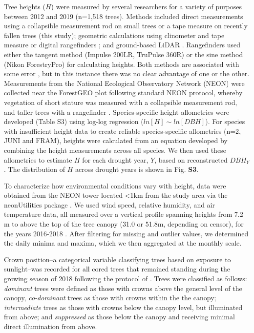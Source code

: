 \documentclass[
]{article}
\begin{document}
Tree heights (\(H\)) were measured by several researchers for a variety
of purposes between 2012 and 2019 (n=1,518 trees). Methods included
direct measurements using a collapsible measurement rod on small trees
\citep{neon_national_2018} or a tape measure on recently fallen trees
(this study); geometric calculations using clinometer and tape measure
\citep{stovall_assessing_2018} or digital rangefinders
\citep{andersonteixeira_size-related_2015, neon_national_2018}; and
ground-based LiDAR \citep{stovall_terrestrial_2018}. Rangefinders used
either the tangent method (Impulse 200LR, TruPulse 360R) or the sine
method (Nikon ForestryPro) for calculating heights. Both methods are
associated with some error \citep{larjavaara_measuring_2013}, but in
this instance there was no clear advantage of one or the other.
Measurements from the National Ecological Observatory Network (NEON)
were collected near the ForestGEO plot following standard NEON protocol,
whereby vegetation of short stature was measured with a collapsible
measurement rod, and taller trees with a rangefinder
\citep{neon_national_2018}. Species-specific height allometries were
developed (Table S3) using log-log regression (\(ln[H] \sim ln[DBH]\)).
For species with insufficient height data to create reliable
species-specific allometries (n=2, JUNI and FRAM), heights were
calculated from an equation developed by combining the height
measurements across all species. We then used these allometries to
estimate \(H\) for each drought year, \(Y\), based on reconstructed
\(DBH_Y\). The distribution of \(H\) across drought years is shown in
Fig. \textbf{S3}.

To characterize how environmental conditions vary with height, data were
obtained from the NEON tower located \textless1km from the study area
via the neonUtilities package \citep{R-neonUtilities}. We used wind
speed, relative humidity, and air temperature data, all measured over a
vertical profile spanning heights from 7.2 m to above the top of the
tree canopy (31.0 or 51.8m, depending on censor), for the years
2016-2018 \citep{neon_national_2018}. After filtering for missing and
outlier values, we determined the daily minima and maxima, which we then
aggregated at the monthly scale.

Crown position--a categorical variable classifying trees based on
exposure to sunlight--was recorded for all cored trees that remained
standing during the growing season of 2018 following the protocol of
\citet{jennings_assessing_1999}. Trees were classified as follows:
\emph{dominant} trees were defined as those with crowns above the
general level of the canopy, \emph{co-dominant} trees as those with
crowns within the the canopy; \emph{intermediate} trees as those with
crowns below the canopy level, but illuminated from above; and
\emph{suppressed} as those below the canopy and receiving minimal direct
illumination from above.
\end{document}
